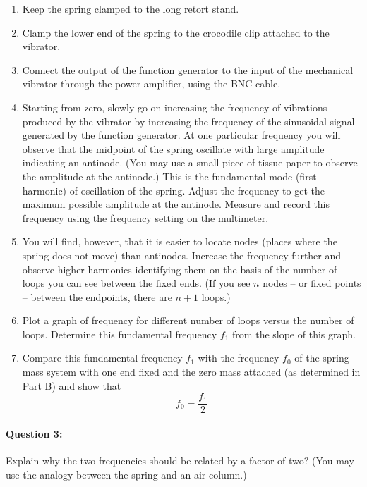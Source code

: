 \begin{enumerate}
\item Keep the spring clamped to the long retort stand.

\item Clamp the lower end of the spring to the crocodile clip attached to the vibrator.

\item Connect the output of the function generator to the input of the mechanical vibrator
through the power amplifier, using the BNC cable.

\item Starting from zero, slowly go on increasing the frequency of vibrations produced by the vibrator by increasing the frequency of the sinusoidal signal generated by the function generator. At one particular frequency you will observe that the midpoint of the spring oscillate with large amplitude indicating an antinode. (You may use a small piece of tissue paper to observe the amplitude at the antinode.) This is the fundamental mode (first harmonic) of oscillation of the spring. Adjust the frequency to get the maximum possible amplitude at the antinode. Measure and record this frequency using the frequency setting on the multimeter.

\item You will find, however, that it is easier to locate nodes (places where the spring does not move) than antinodes. Increase the frequency further and observe higher harmonics identifying them on the basis of the number of loops you can see between the fixed ends. (If you see $n$ nodes -- or fixed points -- between the endpoints, there are $n+1$ loops.)

\item Plot a graph of frequency for different number of loops versus the number of loops. Determine this fundamental frequency $f_1$ from the slope of this graph.

\item Compare this fundamental frequency $f_1$ with the frequency $f_0$ of the spring mass
system with one end fixed and the zero mass attached (as determined in Part B) and
show that $$f_0 = \frac{f_1}{2}$$
\end{enumerate}

\paragraph{Question 3:} Explain why the two frequencies should be related by a factor of two? (You may use the analogy between the spring and an air column.)


